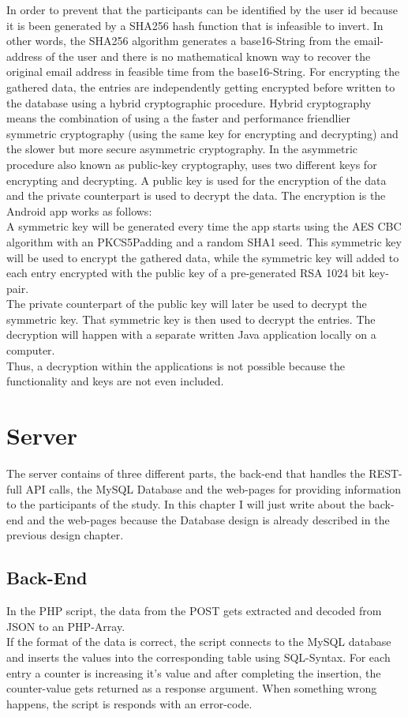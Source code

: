 In order to prevent that the participants can be identified by the user id because it is been generated by a SHA256 hash function that is infeasible to invert. In other words, the SHA256 algorithm generates a base16-String from the email-address of the user and there is no mathematical known way to recover the original email address in feasible time from the base16-String. 
\bigbreak
For encrypting the gathered data, the entries are independently getting encrypted before written to the database using a hybrid cryptographic procedure. Hybrid cryptography means the combination of using a the faster and performance friendlier symmetric cryptography (using the same key for encrypting and decrypting) and the slower but more secure asymmetric cryptography. In the asymmetric procedure also known as public-key cryptography, uses two different keys for encrypting and decrypting. A public key is used for the encryption of the data and the private counterpart is used to decrypt the data.
\bigbreak
The encryption is the Android app works as follows:\\
A symmetric key will be generated every time the app starts using the AES CBC algorithm with an PKCS5Padding and a random SHA1 seed. This symmetric key will be used to encrypt the gathered data, while the symmetric key will added to each entry encrypted with the public key of a pre-generated RSA 1024 bit key-pair.\\ 
The private counterpart of the public key will later be used to decrypt the symmetric key. That symmetric key is then used to decrypt the entries. 
The decryption will happen with a separate written Java application locally on a computer.\\
Thus, a decryption within the applications is not possible because the functionality and keys are not even included. 

\section{Server}
The server contains of three different parts, the back-end that handles the REST-full API calls, the MySQL Database and the web-pages for providing information to the participants of the study. 
In this chapter I will just write about the back-end and the web-pages because the Database design is already described in the previous design chapter. 

\subsection{Back-End}
In the PHP script, the data from the POST gets extracted and decoded from JSON to an PHP-Array.\\
If the format of the data is correct, the script connects to the MySQL database and inserts the values into the corresponding table using SQL-Syntax. For each entry a counter is increasing it's value and after completing the insertion, the counter-value gets returned as a response argument. When something wrong happens, the script is responds with an error-code. 

